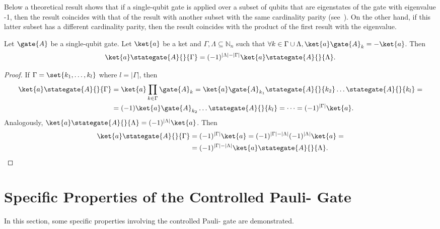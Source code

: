\documentclass[sigconf,natbib=false]{acmart}
\begin{document}
Below a theoretical result shows that  if a single-qubit gate is applied over a subset of qubits that are eigenstates of the gate  with eigenvalue -1, then the result coincides with that of the result with another subset with the same cardinality parity (see~\cite{Nielsen_Chuang_2010}). On the other hand, if this latter subset has a different cardinality parity, then the result coincides with the product of the first result with the eigenvalue.
\begin{proposition}
Let $\gate{A}$ be a single-qubit gate. Let $\ket{a}$ be a ket and $\Gamma, \Lambda \subseteq \mathbb{N}_n$ such that $\forall k \in \Gamma \cup \Lambda, \ket{a} \gate{A}_{k} = -\ket{a}$. Then
\begin{equation}
\ket{a} \stategate{A}{}{\Gamma} = (-1)^{|\Lambda|-|\Gamma|}\ket{a} \stategate{A}{}{\Lambda}.
\end{equation}
\end{proposition}
\begin{proof}
If $\Gamma=\set{k_1,\dots,k_l}$ where $l=|\Gamma|$, then
\begin{align*}
\ket{a} \stategate{A}{}{\Gamma} &= \ket{a} \prod_{k \in \Gamma} \gate{A}_k = \ket{a}\gate{A}_{k_1} \stategate{A}{}{k_2}\dots\stategate{A}{}{k_l} =\\
&= (-1)\ket{a}\gate{A}_{k_2}\dots\stategate{A}{}{k_l} =\dots = (-1)^{|\Gamma|} \ket{a}.
\end{align*}
Analogously, $\ket{a} \stategate{A}{}{\Lambda} = (-1)^{|\Lambda|} \ket{a}$.
Then
\begin{align*}
\ket{a} \stategate{A}{}{\Gamma} &= (-1)^{|\Gamma|} \ket{a} = (-1)^{|\Gamma|-|\Lambda|}(-1)^{|\Lambda|} \ket{a}=\\
&=(-1)^{|\Gamma|-|\Lambda|}\ket{a} \stategate{A}{}{\Lambda}.
\end{align*}
\end{proof}

\section{Specific Properties of the Controlled Pauli- Gate}
In this section, some specific properties involving  the controlled Pauli- gate are demonstrated.
\end{document}
